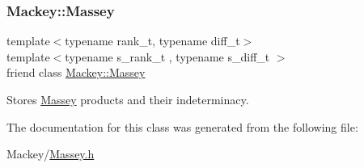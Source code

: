 \subsubsection{\texorpdfstring{Mackey\+::\+Massey}{Mackey::Massey}}
{\footnotesize\ttfamily template$<$typename rank\+\_\+t, typename diff\+\_\+t$>$ \\
template$<$typename s\+\_\+rank\+\_\+t , typename s\+\_\+diff\+\_\+t $>$ \\
friend class \hyperlink{classMackey_1_1Massey}{Mackey\+::\+Massey}\hspace{0.3cm}{\ttfamily [friend]}}



Stores \hyperlink{classMackey_1_1Massey}{Massey} products and their indeterminacy. 



The documentation for this class was generated from the following file\+:\begin{DoxyCompactItemize}
\item 
Mackey/\hyperlink{Massey_8h}{Massey.\+h}\end{DoxyCompactItemize}
